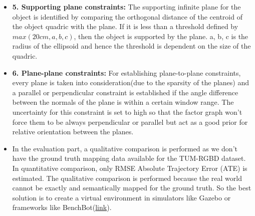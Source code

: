 \documentclass[report.tex]{subfiles}
\begin{document}
\begin{itemize}
\item \textbf{5. Supporting plane constraints: } The supporting infinite plane for the object is identified by comparing the orthogonal distance of the centroid of the object quadric with the plane. If it is less than a threshold defined by $max(20cm, a, b, c)$, then the object is supported by the plane. a, b, c is the radius of the ellipsoid and hence the threshold is dependent on the size of the quadric.

\item \textbf{6. Plane-plane constraints: } For establishing plane-to-plane constraints, every plane is taken into consideration(due to the sparsity of the planes) and a parallel or perpendicular constraint is established if the angle difference between the normals of the plane is within a certain window range. The uncertainty for this constraint is set to high so that the factor graph won't force them to be always perpendicular or parallel but act as a good prior for relative orientation between the planes.


\item In the evaluation part, a qualitative comparison is performed as we don't have the ground truth mapping data available for the TUM-RGBD dataset. In quantitative comparison, only RMSE Absolute Trajectory Error (ATE) is estimated. The qualitative comparison is performed because the real world cannot be exactly and semantically mapped for the ground truth. So the best solution is to create a virtual environment in simulators like Gazebo or frameworks like BenchBot(\href{https://github.com/qcr/benchbot}{link}).

\end{itemize}
\end{document}
